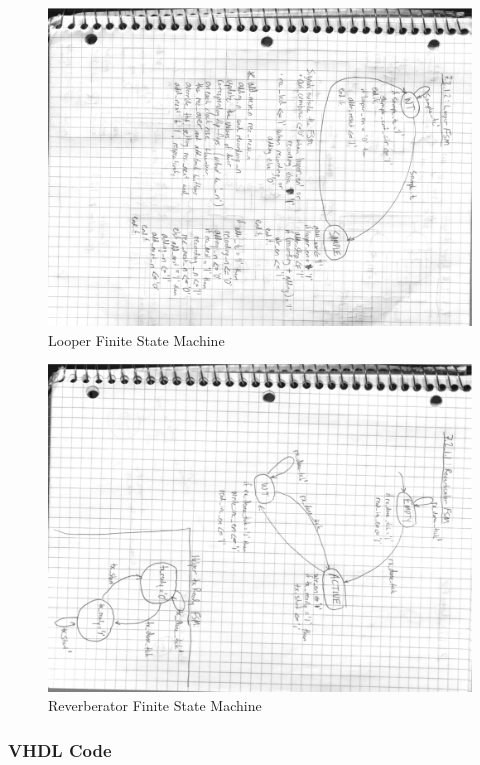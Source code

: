 \documentclass[12pt]{article}
\begin{document}
\begin{figure}[!htb]
\centering
\includegraphics[width=1\textwidth, height=0.5\textheight, angle=90]{looperFSM.eps}
\caption{Looper Finite State Machine}
\end{figure}

\begin{figure}[!htb]
\centering
\includegraphics[width=1\textwidth, height=0.5\textheight, angle=90]{reverberatorFSM.eps}
\caption{Reverberator Finite State Machine}
\end{figure}



\subsubsection{VHDL Code}
\end{document}
